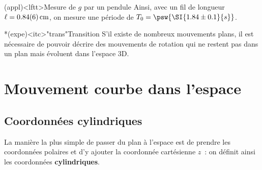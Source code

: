 \documentclass[../../main/main.tex]{subfiles}
\begin{document}
\begin{tcb*}(appl)<lftt>{Mesure de $g$ par un pendule}
	Ainsi, avec un fil de longueur $\ell = \SI{0.84\pm0.06}{cm}$, on mesure une
	période de $T_0 = \psw{\SI{1.84\pm0.1}{s}}$.
  \smallbreak
\end{tcb*}

\begin{tcb}*(expe)<itc>"trans"{Transition}
	S'il existe de nombreux mouvements plans, il est nécessaire de pouvoir
	décrire des mouvements de rotation qui ne restent pas dans un plan mais
	évoluent dans l'espace 3D.
\end{tcb}

\section{Mouvement courbe dans l'espace}
\subsection{Coordonnées cylindriques}

La manière la plus simple de passer du plan à l'espace est de prendre les
coordonnées polaires et d'y ajouter la coordonnée cartésienne $z$~: on définit
ainsi les coordonnées \textbf{cylindriques}.
\end{document}
